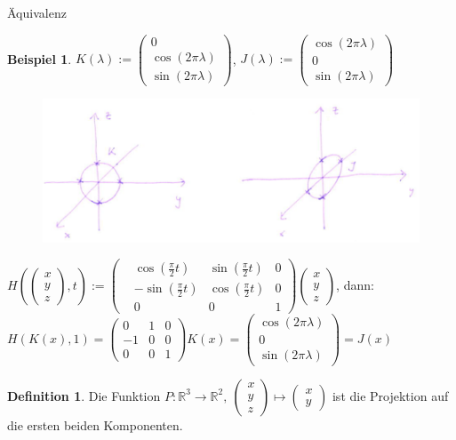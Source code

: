 \documentclass[a4paper,pagesizefontsize=12pt]{scrartcl}
\newcommand\R{\mathbb{R}}
\theoremstyle{definition}
\newtheorem{defi}{Definition}
\newtheorem*{bsp*}{Beispiel}
\theoremstyle{remark}
\begin{document}
\begin{section}{Äquivalenz}
\begin{bsp*}
$K(\lambda) := \begin{pmatrix}0\\\cos (2\pi \lambda)\\ \sin(2\pi \lambda) \end{pmatrix}$, $J(\lambda) := \begin{pmatrix}\cos (2\pi \lambda)\\ 0\\ \sin(2\pi \lambda) \end{pmatrix}$
\begin{figure}[H]
\center
\includegraphics[width=0.7\linewidth]{Kreise}
\end{figure}
$H(\begin{pmatrix}x\\y\\ z \end{pmatrix},t) := 
\begin{pmatrix}
&\cos (\frac{\pi}{2} t) & \sin (\frac{\pi}{2} t) & 0 \\
&-\sin (\frac{\pi}{2} t) & \cos (\frac{\pi}{2} t) & 0 \\
& 0 & 0 & 1
\end{pmatrix} 
\begin{pmatrix}
x\\y\\z
\end{pmatrix}$, dann: \vspace{0.4 cm} \\ 
$H(K(x),1) = \begin{pmatrix}
0 & 1 & 0 \\
-1 & 0 & 0 \\
0 & 0 & 1
\end{pmatrix} K(x) = \begin{pmatrix}\cos (2\pi \lambda)\\ 0\\ \sin(2\pi \lambda) \end{pmatrix} = J(x)$
\end{bsp*}
\vspace{0.2cm}

\begin{defi}
Die Funktion $P: \R ^3 \longrightarrow \R ^2,\ \begin{pmatrix}
x\\y\\z
\end{pmatrix} \mapsto \begin{pmatrix}
x\\y
\end{pmatrix}$ ist die Projektion auf die ersten beiden Komponenten.
\end{defi}
\vspace{0.2cm}


\end{section}
\end{document}
